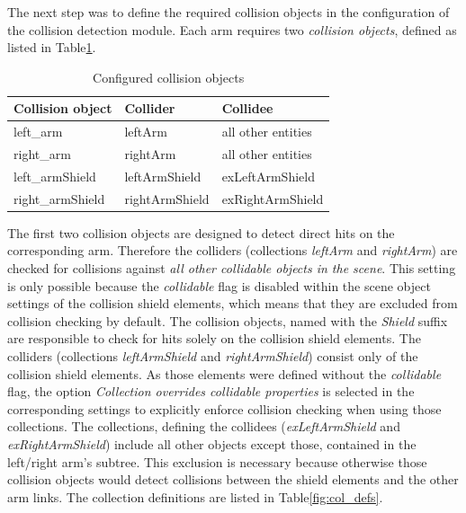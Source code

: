 The next step was to define the required collision objects in the configuration of the collision detection module. Each arm requires two \emph{collision objects}, defined as listed in Table\ref{fig:col_groups}. 
\begin{table}
  \centering
  \begin{tabular}[h]{|l|l|l|} \hline
	\textbf{Collision object} & \textbf{Collider} & \textbf{Collidee} \\ \hline
	left\_arm & leftArm & all other entities \\
	right\_arm & rightArm & all other entities \\
	left\_armShield & leftArmShield & exLeftArmShield \\
	right\_armShield & rightArmShield & exRightArmShield \\ \hline
  \end{tabular}
  \caption{Configured collision objects}
  \label{fig:col_groups}
\end{table}
The first two collision objects are designed to detect direct hits on the corresponding arm.  
Therefore the colliders (collections \emph{leftArm} and \emph{rightArm}) are checked for collisions against \emph{all other collidable objects in the scene}. This setting is only possible because the \emph{collidable} flag is disabled within the scene object settings of the collision shield elements, which means that they are excluded from collision checking by default. The collision objects, named with the \emph{Shield} suffix are responsible to check for hits solely on the collision shield elements. The colliders (collections \emph{leftArmShield} and \emph{rightArmShield}) consist only of the collision shield elements. As those elements were defined without the \emph{collidable} flag, the option \emph{Collection overrides collidable properties} is selected in the corresponding settings to explicitly enforce collision checking when using those collections. The collections, defining the collidees (\emph{exLeftArmShield} and \emph{exRightArmShield}) include all other objects except those, contained in the left/right arm's subtree. This exclusion is necessary because otherwise those collision objects would detect collisions between the shield elements and the other arm links. The collection definitions are listed in Table\ref{fig:col_defs}.
